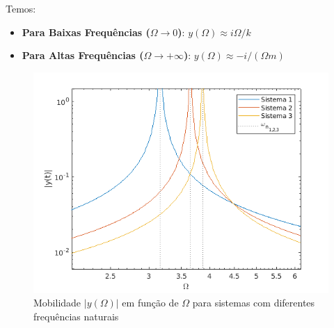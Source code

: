 \documentclass{article}
\begin{document}
Temos:
\begin{itemize}
    \item \textbf{Para Baixas Frequências ($\Omega \rightarrow 0$)}: $y(\Omega) \approx i\Omega/k$
    \item \textbf{Para Altas Frequências ($\Omega \rightarrow +\infty$)}: $y(\Omega) \approx -i/(\Omega m)$
\end{itemize}

\begin{figure}[h]
    \centering
    \includegraphics[width=.5\textwidth]{imgs/mobilidade.png}
    \caption{Mobilidade $|y(\Omega)|$ em função de $\Omega$ para  sistemas com diferentes frequências naturais}
\end{figure}
\end{document}
